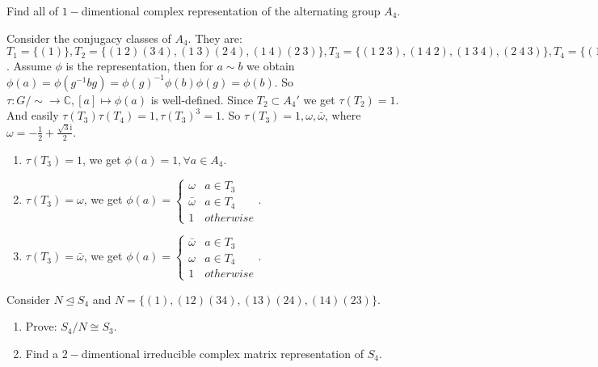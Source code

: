 \documentclass{ctexart}
\newif\ifpreface
\begin{document}
\large
\setlength{\baselineskip}{1.2em}
\ifpreface
    
\else
\maketitle
\fi
{}
\begin{problem}
 Find all of $1-$dimentional complex representation of the alternating group $A_4$.
\end{problem}

\begin{solution}
 Consider the conjugacy classes of $A_4$. They are: $T_1=\{(1)\},T_2=\{(1\ 2)(3\ 4),(1\ 3)(2\ 4),(1\ 4)(2\ 3)\},T_3=\{(1\ 2\ 3),(1\ 4\ 2),(1\ 3\ 4),(2\ 4\ 3)\},T_4=\{(1\ 3\ 2),(1\ 2\ 4),(1\ 4\ 3),(2\ 3\ 4)\}$. Assume $\phi$ is the representation, then for $a\sim b$ we obtain $\phi(a)=\phi(g^{-1}bg)=\phi(g)^{-1}\phi(b)\phi(g)=\phi(b)$. 
 So $\tau:G/\sim\to \mathbb{C},[a]\mapsto \phi(a)$ is well-defined. 
 Since $T_2\subset A_4'$ we get $\tau(T_2)=1$. And easily $\tau(T_3)\tau(T_4)=1,\tau(T_3)^3=1$. So $\tau(T_3)=1,\omega,\bar{\omega}$, where $\omega=-\frac{1}{2}+\frac{\sqrt{3}\mathrm{i}}{2}$. 
 \begin{enumerate}
  \item $\tau(T_3)=1$, we get $\phi(a)=1,\forall a\in A_4$. 
  \item $\tau(T_3)=\omega$, we get $\phi(a)=\begin{cases}
   \omega & a\in T_3\\\bar{\omega} & a\in T_4 \\ 1 & otherwise 
  \end{cases}$. 
  \item $\tau(T_3)=\bar{\omega}$, we get $\phi(a)=\begin{cases}
   \bar{\omega} & a\in T_3\\\omega & a\in T_4 \\ 1 & otherwise 
  \end{cases}$. 
 \end{enumerate} 
\end{solution}

\begin{problem}\label{pro:2}
 Consider $N\trianglelefteq S_4$ and $N=\{(1),(12)(34),(13)(24),(14)(23)\}$. 
 \begin{enumerate}
  \item Prove: $S_4/N\cong S_3$. 
  \item Find a $2-$dimentional irreducible complex matrix representation of $S_4$. 
 \end{enumerate}
\end{problem}
\end{document}
